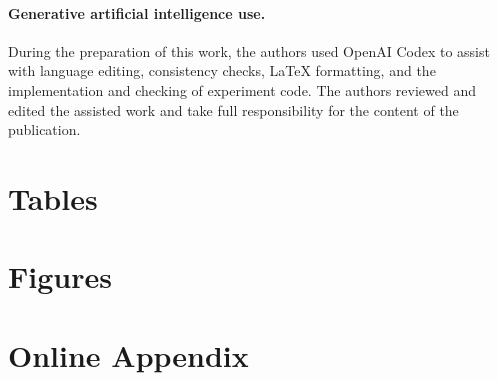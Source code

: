 \documentclass{article}
\theoremstyle{definition}
\theoremstyle{remark}
\begin{document}
\paragraph{Generative artificial intelligence use.}
During the preparation of this work, the authors used OpenAI Codex to
assist with language editing, consistency checks, LaTeX formatting,
and the implementation and checking of experiment code. The authors
reviewed and edited the assisted work and take full responsibility for
the content of the publication.

\clearpage



\clearpage
\section*{Tables}


\clearpage
\section*{Figures}


\clearpage
\appendix
\section*{Online Appendix}
\renewcommand{\thesection}{S\arabic{section}}
\renewcommand{\thesubsection}{S\arabic{section}.\arabic{subsection}}
\renewcommand{\thefigure}{S\arabic{figure}}
\renewcommand{\thetable}{S\arabic{table}}
\renewcommand{\theequation}{S\arabic{equation}}
\renewcommand{\theHsection}{supp.\arabic{section}}
\renewcommand{\theHsubsection}{supp.\arabic{section}.\arabic{subsection}}
\renewcommand{\theHfigure}{supp.\arabic{figure}}
\renewcommand{\theHtable}{supp.\arabic{table}}
\renewcommand{\theHequation}{supp.\arabic{equation}}
\setcounter{section}{0}
\setcounter{figure}{0}
\setcounter{table}{0}
\setcounter{equation}{0}


\end{document}
